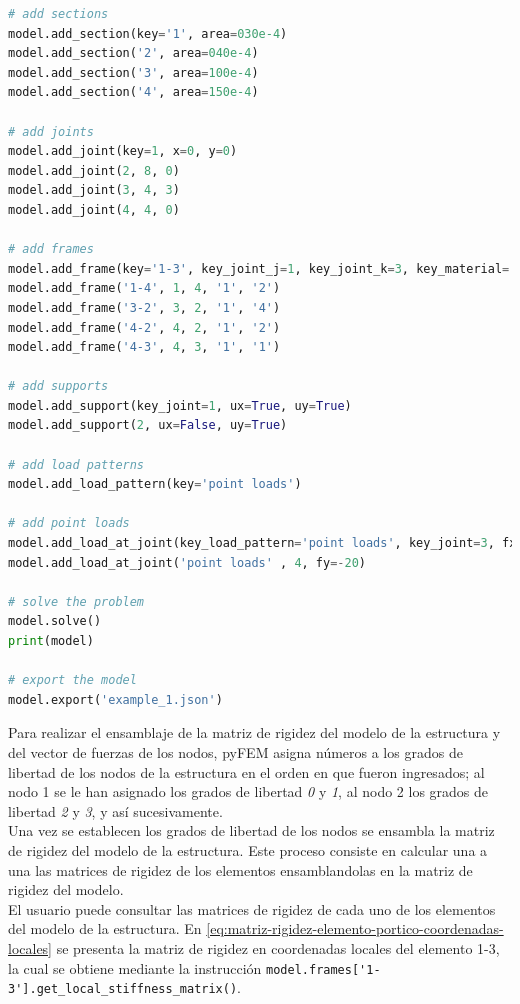 \begin{ejemplo}
\begin{lstlisting}[language=Python,caption=Ingreso de los datos del modelo de la estructura a \textit{pyFEM}.,label=alg:cercha_plana, frame=single]
# add sections
model.add_section(key='1', area=030e-4)
model.add_section('2', area=040e-4)
model.add_section('3', area=100e-4)
model.add_section('4', area=150e-4)

# add joints
model.add_joint(key=1, x=0, y=0)
model.add_joint(2, 8, 0)
model.add_joint(3, 4, 3)
model.add_joint(4, 4, 0)

# add frames
model.add_frame(key='1-3', key_joint_j=1, key_joint_k=3, key_material='1', key_section='3')
model.add_frame('1-4', 1, 4, '1', '2')
model.add_frame('3-2', 3, 2, '1', '4')
model.add_frame('4-2', 4, 2, '1', '2')
model.add_frame('4-3', 4, 3, '1', '1')

# add supports
model.add_support(key_joint=1, ux=True, uy=True)
model.add_support(2, ux=False, uy=True)

# add load patterns
model.add_load_pattern(key='point loads')

# add point loads
model.add_load_at_joint(key_load_pattern='point loads', key_joint=3, fx=5 * 0.8, fy=5 * 0.6)
model.add_load_at_joint('point loads' , 4, fy=-20)

# solve the problem
model.solve()
print(model)

# export the model
model.export('example_1.json')
  \end{lstlisting}

  Para realizar el ensamblaje de la matriz de rigidez del modelo de la estructura y del vector de fuerzas de los nodos, pyFEM asigna números a los grados de libertad de los nodos de la estructura en el orden en que fueron ingresados; al nodo 1 se le han asignado los grados de libertad \emph{0} y \emph{1}, al nodo 2 los grados de libertad \emph{2} y \emph{3}, y así sucesivamente.\\

  Una vez se establecen los grados de libertad de los nodos se ensambla la matriz de rigidez del modelo de la estructura. Este proceso consiste en calcular una a una las matrices de rigidez de los elementos ensamblandolas en la matriz de rigidez del modelo.\\

  El usuario puede consultar las matrices de rigidez de cada uno de los elementos del modelo de la estructura. En \eqref{eq:matriz-rigidez-elemento-portico-coordenadas-locales} se presenta la matriz de rigidez en coordenadas locales del elemento 1-3, la cual se obtiene mediante la instrucción \verb|model.frames['1-3'].get_local_stiffness_matrix()|.\\


\end{ejemplo}
